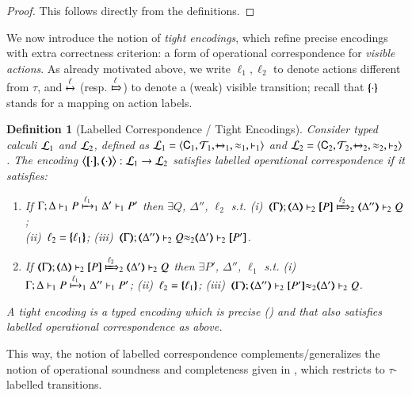 \documentclass[preprint,11pt]{elsarticle}
\newtheorem{definition}{Definition}[section]
\begin{document}
{\begin{proof}
This follows directly from the definitions.
\end{proof}

We now introduce the notion of \emph{tight encodings}, which refine precise encodings with 
extra correctness criterion: a form of operational correspondence 
for \emph{visible actions}. 
As already motivated above, 
we write $\ell_1, \ell_2$ to denote  
actions different from $\tau$,
and  $\hby{\ell}$ (resp. $\Hby{\ell}$) to denote a (weak) visible transition;
recall that $\mapa{\cdot}$ stands for a mapping 
on action labels.

\begin{definition}[Labelled Correspondence / Tight Encodings]%
\label{def:lopco}
       Consider typed calculi $\tyl{L}_1$ and  $\tyl{L}_2$, defined as 
        $\tyl{L}_1=\calc{\CAL_1}{{\cal{T}}_1}{\hby{{~}}_1}{\wb_1}{\proves_1}$
       and $\tyl{L}_2=\calc{\CAL_2}{{\cal{T}}_2}{\hby{{~}}_2}{\wb_2}{\proves_2}$.
The encoding $\enco{\map{\cdot}, \mapt{\cdot}}: \tyl{L}_1 \to \tyl{L}_2$ satisfies
\emph{labelled operational correspondence}
if it satisfies:
	\begin{enumerate}[1.]
			\item
					If		$\stytraargi{\Gamma}{\ell_1}{\Delta}{P}{\Delta'}{P'}{1}{1}$
					then	$\exists Q$, $\Delta''$, $\ell_2$ s.t. 
							(i)~$\wtytraargi{\mapt{\Gamma}}{\ell_2}{\mapt{\Delta}}{\map{P}}{\mapt{\Delta''}}{Q}{2}{2}$;  \\
							(ii)~$\ell_2 = \mapa{\ell_1}$; 
							(iii)~${\mapt{\Gamma}};{\mapt{\Delta''}}\proves_2 {Q}{\wb_2}{\mapt{\Delta'}}\proves_2 {\map{P'}}$.
				
			\item
					If		$\wtytraargi{\mapt{\Gamma}}{\ell_2}{\mapt{\Delta}}{\map{P}}{\mapt{\Delta'}}{Q}{2}{2}$
					then	$\exists P'$, $\Delta''$, $\ell_1$ s.t. 
							(i)~$\stytraargi{\Gamma}{\ell_1}{\Delta}{P}{\Delta''}{P'}{1}{1}$;
							(ii)~$\ell_2 = \mapa{\ell_1}$;
							(iii)~${\mapt{\Gamma}};{\mapt{\Delta''}}\proves_2 {\map{P'}}{\wb_2}{\mapt{\Delta'}}\proves_2 {Q}$.
	\end{enumerate}
A \emph{tight encoding} is a typed 
encoding 
which is precise () and that also satisfies 
labelled operational correspondence as above.
\end{definition}

This way, 
the notion of labelled correspondence complements/generalizes the notion of operational soundness and completeness 
given in , which restricts to $\tau$-labelled transitions.

}
\end{document}

